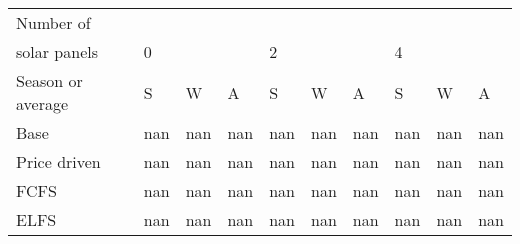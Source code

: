 \begin{table}[h] 
\centering 
\begin{tabular}{l|lll|lll|lll}Number of \\ solar panels&0& & &2& & &4& & \\ \hline 
Season or average & S & W & A & S & W & A & S & W & A \\ \hline 
Base&nan&nan&nan&nan&nan&nan&nan&nan&nan \\ 
Price driven&nan&nan&nan&nan&nan&nan&nan&nan&nan \\ 
FCFS&nan&nan&nan&nan&nan&nan&nan&nan&nan \\ 
ELFS&nan&nan&nan&nan&nan&nan&nan&nan&nan \\ 
\end{tabular} 
\end{table}